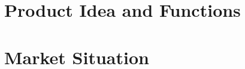 \documentclass{article}
\begin{document}
\begin{titlepage}
		
		
		
		
		\vfill %
		
	\end{titlepage}
	
	
	\tableofcontents
	
	\newpage
	\listoffigures
	
	\vspace{2.5cm}
	\listoftables
	
	\newpage
	\section{Product Idea and Functions}
	
	\newpage
	\section{Market Situation}
\end{document}
